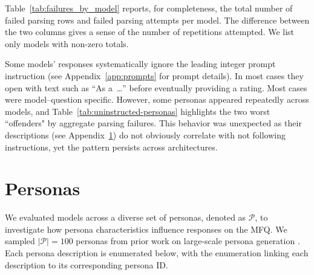 \documentclass{article}
\begin{document}
Table~\ref{tab:failures_by_model} reports, for completeness, the total number of failed parsing rows and failed parsing attempts per model. The difference between the two columns gives a sense of the number of repetitions attempted. We list only models with non-zero totals.



Some models' responses systematically ignore the leading integer prompt instruction (see Appendix~\ref{app:prompts} for prompt details). In most cases they open with text such as ``As a~\ldots'' before eventually providing a rating. Most cases were model--question specific. However, some personas appeared repeatedly across models, and Table~\ref{tab:uninstructed-personas} highlights the two worst ``offenders" by aggregate parsing failures. This behavior was unexpected as their descriptions (see Appendix~\ref{app:personas}) do not obviously correlate with not following instructions, yet the pattern persists across architectures.

\begin{table}[t!]
  \centering
  \caption{Personas with the highest parsing failure counts.}
  \label{tab:uninstructed-personas}
\end{table}




\section{Personas}
\label{app:personas}
We evaluated models across a diverse set of personas, denoted as $\mathcal{P}$, to investigate how persona characteristics influence responses on the MFQ. We sampled $|\mathcal{P}| = 100$ personas from prior work on large-scale persona generation \citep{ge2025scalingsyntheticdatacreation}. Each persona description is enumerated below, with the enumeration linking each description to its corresponding persona ID.

\end{document}

